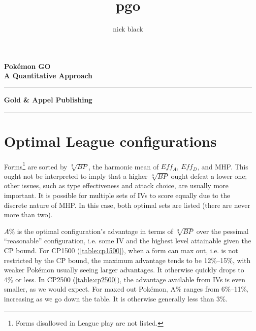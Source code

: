 \documentclass[ebook,10pt,openany,oneside]{memoir}
\title{pgo}
\author{nick black}
\def\LOGO {
  \textbf{
    \Huge Pokémon GO\\
    \Large A Quantitative Approach\\
  }}
\begin{document}
  \pagestyle{empty}
  \begin{center}
  \LOGO
  \vspace{0.5in}
  \end{center}
  \vfill
  \hrule
  \begin{center}
    \textbf{\textsf{Gold \& Appel Publishing}}
  \end{center}
  \hrule
  \clearpage
  \setcounter{page}{1}
  \pagestyle{plain} %

\ifdefined\epub
\else
  \hypertarget{toc}{}%
  \tableofcontents*
  \clearpage
  \hypertarget{lot}{}%
  \listoftables*
  \hypertarget{lof}{}%
  \listoffigures*
  \fi

%














\appendix
\chapter{Optimal League configurations}
\label{chap:optimal}
Forms\footnote{Forms disallowed in League play are not listed.} are sorted by $\sqrt[3]{BP}$, the harmonic mean of $Eff_A$, $Eff_D$, and MHP\@.
This ought not be interpreted to imply that a higher $\sqrt[3]{BP}$ ought
  defeat a lower one; other issues, such as type effectiveness and attack
  choice, are usually more important.
It is possible for multiple sets of IVs to score equally due to the discrete nature
  of MHP\@.
In this case, both optimal sets are listed (there are never more than two).

$A\%$ is the optimal configuration's advantage in terms of $\sqrt[3]{BP}$
  over the pessimal ``reasonable'' configuration, i.e. some IV
  and the highest level attainable given the CP bound.
For CP1500 (\autoref{table:cp1500}), when a form can max out, i.e. is not restricted by the CP bound,
  the maximum advantage tends to be 12\%--15\%, with weaker Pokémon usually
  seeing larger advantages.
It otherwise quickly drops to 4\% or less.
In CP2500 (\autoref{table:cp2500}), the advantage available from IVs is even smaller, as we would expect.
For maxed out Pokémon, A\% ranges from 6\%--11\%, increasing as we go down the table.
It is otherwise generally less than 3\%.
\end{document}
